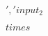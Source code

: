 \documentclass[preview]{standalone}
\begin{document}
\begin{align*}
', 'input_2\\ \\times\\
\end{align*}
\end{document}
